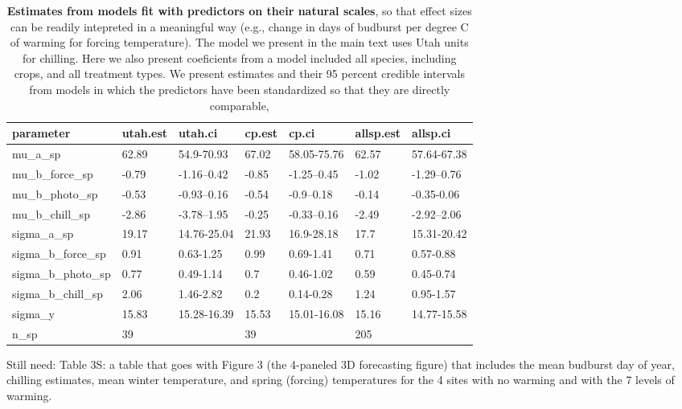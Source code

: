 \documentclass{article}
\begin{document}
\begin{table}[ht]
\centering
\caption{\textbf{Estimates from models fit with predictors on their natural scales},  so that effect sizes can be readily intepreted in a meaningful way (e.g., change in days of budburst per degree C of warming for forcing temperature). The model we present in the main text uses Utah units for chilling. Here we also present coeficients from a model included all species, including crops, and all treatment types. We present estimates and their 95 percent credible intervals from models in which the predictors have been standardized so that they are directly comparable,} 
\label{tab:methods}
\begingroup\footnotesize
\begin{tabular}{|p{}|p{}|p{}|p{}|p{}|p{}|p{}|}
  \hline
parameter & utah.est & utah.ci & cp.est & cp.ci & allsp.est & allsp.ci \\ 
  \hline
mu\_a\_sp & 62.89 & 54.9-70.93 & 67.02 & 58.05-75.76 & 62.57 & 57.64-67.38 \\ 
  mu\_b\_force\_sp & -0.79 & -1.16--0.42 & -0.85 & -1.25--0.45 & -1.02 & -1.29--0.76 \\ 
  mu\_b\_photo\_sp & -0.53 & -0.93--0.16 & -0.54 & -0.9--0.18 & -0.14 & -0.35-0.06 \\ 
  mu\_b\_chill\_sp & -2.86 & -3.78--1.95 & -0.25 & -0.33--0.16 & -2.49 & -2.92--2.06 \\ 
  sigma\_a\_sp & 19.17 & 14.76-25.04 & 21.93 & 16.9-28.18 & 17.7 & 15.31-20.42 \\ 
  sigma\_b\_force\_sp & 0.91 & 0.63-1.25 & 0.99 & 0.69-1.41 & 0.71 & 0.57-0.88 \\ 
  sigma\_b\_photo\_sp & 0.77 & 0.49-1.14 & 0.7 & 0.46-1.02 & 0.59 & 0.45-0.74 \\ 
  sigma\_b\_chill\_sp & 2.06 & 1.46-2.82 & 0.2 & 0.14-0.28 & 1.24 & 0.95-1.57 \\ 
  sigma\_y & 15.83 & 15.28-16.39 & 15.53 & 15.01-16.08 & 15.16 & 14.77-15.58 \\ 
   \hline
n\_sp & 39 &  & 39 &  & 205 &  \\ 
   \hline
\end{tabular}
\endgroup
\end{table}

Still need: Table 3S: a table that goes with Figure 3 (the 4-paneled 3D forecasting figure) that includes the mean budburst day of year, chilling estimates, mean winter temperature, and spring (forcing) temperatures for the 4 sites with no warming and with the 7 levels of warming.
\end{document}

